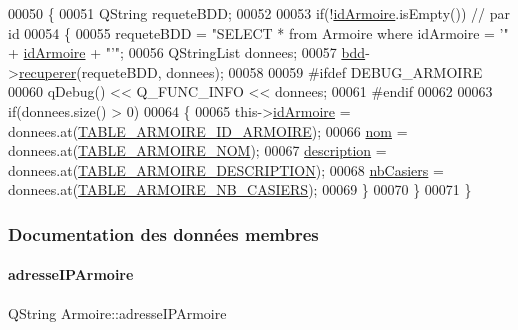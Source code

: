 \begin{DoxyCode}
00050 \{
00051     QString requeteBDD;
00052 
00053     \textcolor{keywordflow}{if}(!\hyperlink{class_armoire_a131caceb7d4b90cb7761851757e80f57}{idArmoire}.isEmpty()) \textcolor{comment}{// par id}
00054     \{
00055         requeteBDD = \textcolor{stringliteral}{"SELECT * from Armoire where idArmoire = '"} + \hyperlink{class_armoire_a131caceb7d4b90cb7761851757e80f57}{idArmoire} + \textcolor{stringliteral}{"'"};
00056         QStringList donnees;
00057         \hyperlink{class_armoire_a555f656018e7b600987128cdc792e320}{bdd}->\hyperlink{class_bdd_a8f25d29d309041bbf875700db0efd97b}{recuperer}(requeteBDD, donnees);
00058 
00059 \textcolor{preprocessor}{        #ifdef DEBUG\_ARMOIRE}
00060             qDebug() << Q\_FUNC\_INFO << donnees;
00061 \textcolor{preprocessor}{        #endif}
00062 
00063         \textcolor{keywordflow}{if}(donnees.size() > 0)
00064         \{
00065             this->\hyperlink{class_armoire_a131caceb7d4b90cb7761851757e80f57}{idArmoire} = donnees.at(\hyperlink{_armoire_8h_a8c8e83929e4df868beea17eda4fb5dada167bbea3f9d799583c77d0a6b12ed99e}{TABLE\_ARMOIRE\_ID\_ARMOIRE});
00066             \hyperlink{class_armoire_a1de028da0fa3f085e2feaad8311d8795}{nom} = donnees.at(\hyperlink{_armoire_8h_a8c8e83929e4df868beea17eda4fb5dadaed87f53039b2f5f5401a4b4c9ea8a706}{TABLE\_ARMOIRE\_NOM});
00067             \hyperlink{class_armoire_aa18be328693d7602439c779e30156c02}{description} = donnees.at(\hyperlink{_armoire_8h_a8c8e83929e4df868beea17eda4fb5dadaa46613f3c7eb048c8392fb780e801cc8}{TABLE\_ARMOIRE\_DESCRIPTION});
00068             \hyperlink{class_armoire_a9c4e926b7cddb13d097b75b3f5ef3de8}{nbCasiers} = donnees.at(\hyperlink{_armoire_8h_a8c8e83929e4df868beea17eda4fb5dada92634af3316ad54be209ef14cc8a8981}{TABLE\_ARMOIRE\_NB\_CASIERS});
00069         \}
00070     \}    
00071 \}
\end{DoxyCode}


\subsubsection{Documentation des données membres}
\mbox{\label{class_armoire_ab96bd042aa78eaefba0aefb860684ca6}} 
\paragraph{\texorpdfstring{adresse\+I\+P\+Armoire}{adresseIPArmoire}}
{\footnotesize\ttfamily Q\+String Armoire\+::adresse\+I\+P\+Armoire\hspace{0.3cm}{\ttfamily [private]}}



